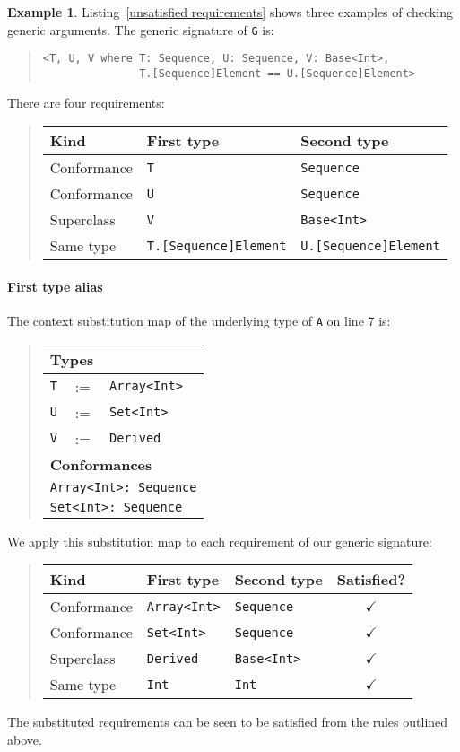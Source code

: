 \documentclass[a4paper,headsepline,bibliography=totoc,toc=flat,fleqn,twoside=semi]{scrbook}
\theoremstyle{definition}
\theoremstyle{definition}
\newtheorem{example}{Example}[chapter]
\theoremstyle{definition}
\newcommand{\SubMapC}[2]{\begin{tabular}{|lll|}
\hline
\multicolumn{3}{|l|}{\textbf{Types}}\\
\hline
#1\\
\hline
\hline
\multicolumn{3}{|l|}{\textbf{Conformances}}\\
\hline
#2\\
\hline
\end{tabular}}
\newcommand{\SubConf}[1]{\multicolumn{3}{|l|}{\texttt{#1}}}
\begin{document}
\begin{example}
Listing~\ref{unsatisfied requirements} shows three examples of checking generic arguments. The generic signature of \texttt{G} is:
\begin{quote}
\begin{verbatim}
<T, U, V where T: Sequence, U: Sequence, V: Base<Int>,
               T.[Sequence]Element == U.[Sequence]Element>
\end{verbatim}
\end{quote}
There are four requirements:
\begin{quote}
\begin{tabular}{|l|l|l|}
\hline
Kind&First type&Second type\\
\hline
Conformance&\texttt{T}&\texttt{Sequence}\\
Conformance&\texttt{U}&\texttt{Sequence}\\
Superclass&\texttt{V}&\texttt{Base<Int>}\\
Same type&\texttt{T.[Sequence]Element}&\texttt{U.[Sequence]Element}\\
\hline
\end{tabular}
\end{quote}

\paragraph{First type alias} The context substitution map of the underlying type of \texttt{A} on line 7 is:
\begin{quote}
\SubMapC{
\texttt{T}&:=&\texttt{Array<Int>}\\
\texttt{U}&:=&\texttt{Set<Int>}\\
\texttt{V}&:=&\texttt{Derived}
}{
\SubConf{Array<Int>:\ Sequence}\\
\SubConf{Set<Int>:\ Sequence}
}
\end{quote}
We apply this substitution map to each requirement of our generic signature:
\begin{quote}
\begin{tabular}{|l|l|l|c|}
\hline
Kind&First type&Second type&Satisfied?\\
\hline
Conformance&\texttt{Array<Int>}&\texttt{Sequence}&$\checkmark$\\
Conformance&\texttt{Set<Int>}&\texttt{Sequence}&$\checkmark$\\
Superclass&\texttt{Derived}&\texttt{Base<Int>}&$\checkmark$\\
Same type&\texttt{Int}&\texttt{Int}&$\checkmark$\\
\hline
\end{tabular}
\end{quote}
The substituted requirements can be seen to be satisfied from the rules outlined above.


\end{example}
\end{document}
